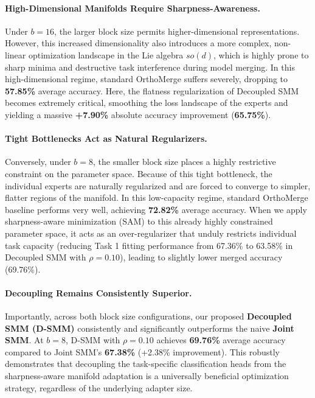 \documentclass{article}
\theoremstyle{plain}
\theoremstyle{definition}
\theoremstyle{remark}
\begin{document}
\paragraph{High-Dimensional Manifolds Require Sharpness-Awareness.} Under $b=16$, the larger block size permits higher-dimensional representations. However, this increased dimensionality also introduces a more complex, non-linear optimization landscape in the Lie algebra $so(d)$, which is highly prone to sharp minima and destructive task interference during model merging. In this high-dimensional regime, standard OrthoMerge suffers severely, dropping to \textbf{57.85\%} average accuracy. Here, the flatness regularization of Decoupled SMM becomes extremely critical, smoothing the loss landscape of the experts and yielding a massive \textbf{+7.90\%} absolute accuracy improvement (\textbf{65.75\%}).

\paragraph{Tight Bottlenecks Act as Natural Regularizers.} Conversely, under $b=8$, the smaller block size places a highly restrictive constraint on the parameter space. Because of this tight bottleneck, the individual experts are naturally regularized and are forced to converge to simpler, flatter regions of the manifold. In this low-capacity regime, standard OrthoMerge baseline performs very well, achieving \textbf{72.82\%} average accuracy. When we apply sharpness-aware minimization (SAM) to this already highly constrained parameter space, it acts as an over-regularizer that unduly restricts individual task capacity (reducing Task 1 fitting performance from 67.36\% to 63.58\% in Decoupled SMM with $\rho = 0.10$), leading to slightly lower merged accuracy (69.76\%).

\paragraph{Decoupling Remains Consistently Superior.} Importantly, across both block size configurations, our proposed \textbf{Decoupled SMM (D-SMM)} consistently and significantly outperforms the naive \textbf{Joint SMM}. At $b=8$, D-SMM with $\rho=0.10$ achieves \textbf{69.76\%} average accuracy compared to Joint SMM's \textbf{67.38\%} (+2.38\% improvement). This robustly demonstrates that decoupling the task-specific classification heads from the sharpness-aware manifold adaptation is a universally beneficial optimization strategy, regardless of the underlying adapter size.
\end{document}

